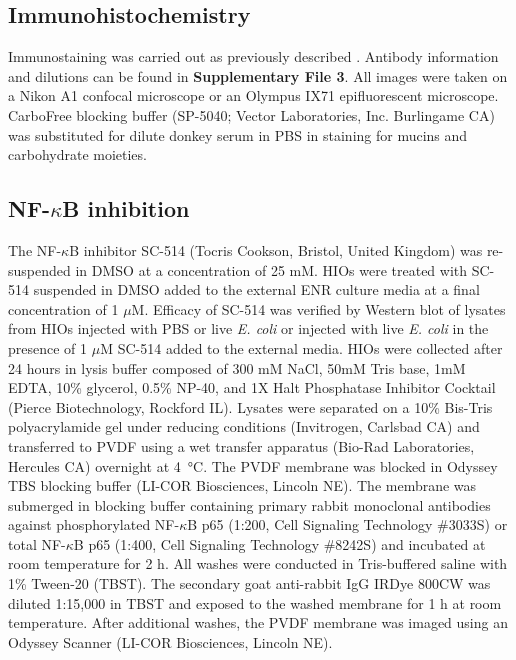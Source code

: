 \documentclass[9pt,lineo]{elife}
\begin{document}
\subsection*{{\bfseries\sffamily } Immunohistochemistry}
\label{sec:orgheadline19}
Immunostaining was carried out as previously described \citep{Finkbeiner:2015}. Antibody information and dilutions can be found in \textbf{Supplementary File 3}. All images were taken on a Nikon A1 confocal microscope or an Olympus IX71 epifluorescent microscope. CarboFree blocking buffer (SP-5040; Vector Laboratories, Inc. Burlingame CA) was substituted for dilute donkey serum in PBS in staining for mucins and carbohydrate moieties.
\subsection*{{\bfseries\sffamily } NF-\(\kappa\)B inhibition}
\label{sec:orgheadline20}
The NF-\(\kappa\)B inhibitor SC-514 \citep{Kishore:2003,Litvak:2009} (Tocris Cookson, Bristol, United Kingdom) was re-suspended in DMSO at a concentration of 25 mM. HIOs were treated with SC-514 suspended in DMSO added to the external ENR culture media at a final concentration of 1 \(\mu\)M. Efficacy of SC-514 was verified by Western blot of lysates from HIOs injected with PBS or live \emph{E. coli} or injected with live \emph{E. coli} in the presence of 1 \(\mu\)M SC-514 added to the external media. HIOs were collected after 24 hours in lysis buffer composed of 300 mM NaCl, 50mM Tris base, 1mM EDTA, 10\% glycerol, 0.5\% NP-40, and 1X Halt Phosphatase Inhibitor Cocktail (Pierce Biotechnology, Rockford IL). Lysates were separated on a 10\% Bis-Tris polyacrylamide gel under reducing conditions (Invitrogen, Carlsbad CA) and transferred to PVDF using a wet transfer apparatus (Bio-Rad Laboratories, Hercules CA) overnight at \SI{4}{\celsius}. The PVDF membrane was blocked in Odyssey TBS blocking buffer (LI-COR Biosciences, Lincoln NE). The membrane was submerged in blocking buffer containing primary rabbit monoclonal antibodies against phosphorylated NF-\(\kappa\)B p65 (1:200, Cell Signaling Technology \#3033S) or total NF-\(\kappa\)B p65 (1:400, Cell Signaling Technology \#8242S) and incubated at room temperature for 2 h. All washes were conducted in Tris-buffered saline with 1\% Tween-20 (TBST). The secondary goat anti-rabbit IgG IRDye 800CW was diluted 1:15,000 in TBST and exposed to the washed membrane for 1 h at room temperature. After additional washes, the PVDF membrane was imaged using an Odyssey Scanner (LI-COR Biosciences, Lincoln NE).
\end{document}
